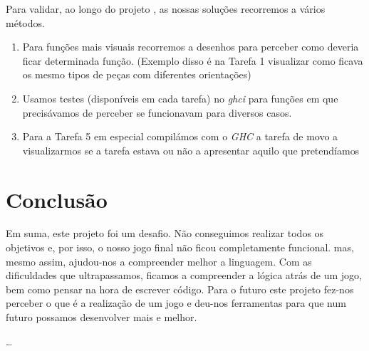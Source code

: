 \documentclass[a4paper]{report} %
\begin{document}
Para validar, ao longo do projeto , as nossas soluções recorremos a vários métodos.

\begin{enumerate}
    \item Para funções mais visuais recorremos a desenhos para perceber como deveria ficar determinada função. (Exemplo disso é na Tarefa 1 visualizar como ficava os mesmo tipos de peças com diferentes orientações)
    \item Usamos testes (disponíveis em cada tarefa) no \emph{ghci} para funções em que precisávamos de perceber se funcionavam para diversos casos.
    \item Para a Tarefa 5 em especial compilámos com o \emph{GHC} a tarefa de movo a visualizarmos se a tarefa estava ou não a apresentar aquilo que pretendíamos
\end{enumerate} 

\chapter{Conclusão}
Em suma, este projeto foi um desafio. Não conseguimos realizar todos os objetivos e, por isso, o nosso jogo final não ficou completamente funcional. mas, mesmo assim, ajudou-nos a compreender melhor a linguagem. Com as dificuldades que ultrapassamos, ficamos a compreender a lógica atrás de um jogo, bem como pensar na hora de escrever código. Para o futuro este projeto fez-nos perceber o que é a realização de um jogo e deu-nos ferramentas para que num futuro possamos desenvolver mais e melhor.


\ldots


    
\end{document}
